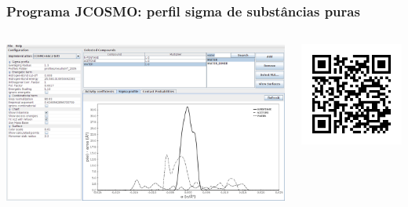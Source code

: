 \documentclass[aspectratio=169]{beamer}
\begin{document}
\begin{frame}
	\frametitle{Programa JCOSMO: perfil sigma de substâncias puras}
	\begin{columns}[t]
		\begin{center}
			\includegraphics[width=1\textwidth]{img/jcosmoPerfilSigma}
		\end{center}
	
		\begin{center}
			\includegraphics[width=1\textwidth]{img/jcosmo_qr}
		\end{center}
	\end{columns}
\end{frame}
 
\end{document}
